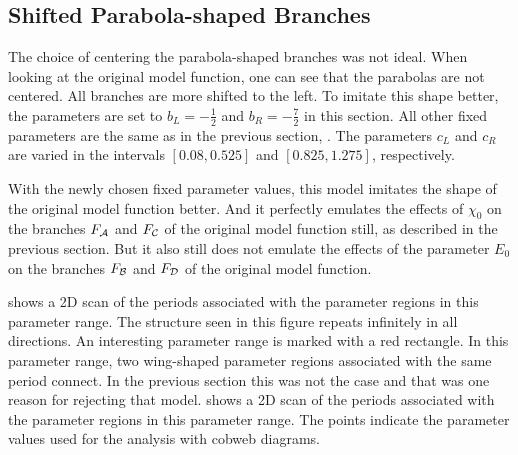 \subsection{Shifted Parabola-shaped Branches}
\label{sec:setup.quad.skewed}

The choice of centering the parabola-shaped branches was not ideal.
When looking at the original model function, one can see that the parabolas are not centered.
All branches are more shifted to the left.
To imitate this shape better, the parameters are set to $b_L = -\frac{1}{2}$ and $b_R = -\frac{7}{2}$ in this section.
All other fixed parameters are the same as in the previous section, .
The parameters $c_L$ and $c_R$ are varied in the intervals $[0.08, 0.525]$ and $[0.825, 1.275]$, respectively.

With the newly chosen fixed parameter values, this model imitates the shape of the original model function better.
And it perfectly emulates the effects of $\chi_0$ on the branches $F_{\mathcal{A}}$ and $F_{\mathcal{C}}$ of the original model function still, as described in the previous section.
But it also still does not emulate the effects of the parameter $E_0$ on the branches $F_{\mathcal{B}}$ and $F_{\mathcal{D}}$ of the original model function.

 shows a 2D scan of the periods associated with the parameter regions in this parameter range.
The structure seen in this figure repeats infinitely in all directions.
An interesting parameter range is marked with a red rectangle.
In this parameter range, two wing-shaped parameter regions associated with the same period connect.
In the previous section this was not the case and that was one reason for rejecting that model.
 shows a 2D scan of the periods associated with the parameter regions in this parameter range.
The points indicate the parameter values used for the analysis with cobweb diagrams.

